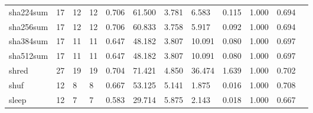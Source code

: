 \begin{longtable}{lp{1.00cm}p{1.00cm}p{1.00cm}p{1.00cm}p{1.00cm}p{1.00cm}p{1.00cm}p{1.00cm}p{1.00cm}p{1.00cm}p{1.00cm}}
sha224sum &                           17 &                 12 &                                12 &                                      0.706 &                                 61.500 &                                        3.781 &                             6.583 &                                   0.115 &                        1.000 &                                        0.694 \\
sha256sum &                           17 &                 12 &                                12 &                                      0.706 &                                 60.833 &                                        3.758 &                             5.917 &                                   0.092 &                        1.000 &                                        0.694 \\
sha384sum &                           17 &                 11 &                                11 &                                      0.647 &                                 48.182 &                                        3.807 &                            10.091 &                                   0.080 &                        1.000 &                                        0.697 \\
sha512sum &                           17 &                 11 &                                11 &                                      0.647 &                                 48.182 &                                        3.807 &                            10.091 &                                   0.080 &                        1.000 &                                        0.697 \\
shred     &                           27 &                 19 &                                19 &                                      0.704 &                                 71.421 &                                        4.850 &                            36.474 &                                   1.639 &                        1.000 &                                        0.702 \\
shuf      &                           12 &                  8 &                                 8 &                                      0.667 &                                 53.125 &                                        5.141 &                             1.875 &                                   0.016 &                        1.000 &                                        0.708 \\
sleep     &                           12 &                  7 &                                 7 &                                      0.583 &                                 29.714 &                                        5.875 &                             2.143 &                                   0.018 &                        1.000 &                                        0.667 \\

\end{longtable}
